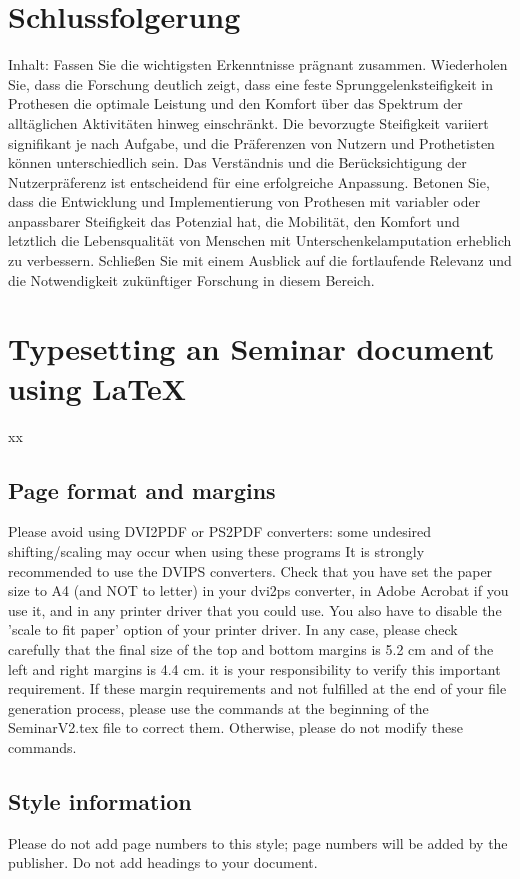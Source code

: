 \documentclass{SeminarV2}
\begin{document}
\section{Schlussfolgerung}
Inhalt: Fassen Sie die wichtigsten Erkenntnisse prägnant zusammen. Wiederholen Sie, dass die Forschung deutlich zeigt, dass eine feste Sprunggelenksteifigkeit in Prothesen die optimale Leistung und den Komfort über das Spektrum der alltäglichen Aktivitäten hinweg einschränkt. Die bevorzugte Steifigkeit variiert signifikant je nach Aufgabe, und die Präferenzen von Nutzern und Prothetisten können unterschiedlich sein. Das Verständnis und die Berücksichtigung der Nutzerpräferenz ist entscheidend für eine erfolgreiche Anpassung. Betonen Sie, dass die Entwicklung und Implementierung von Prothesen mit variabler oder anpassbarer Steifigkeit das Potenzial hat, die Mobilität, den Komfort und letztlich die Lebensqualität von Menschen mit Unterschenkelamputation erheblich zu verbessern. Schließen Sie mit einem Ausblick auf die fortlaufende Relevanz und die Notwendigkeit zukünftiger Forschung in diesem Bereich.

\section{Typesetting an Seminar document using \LaTeX}

xx

\subsection{Page format and margins}
Please avoid using DVI2PDF or PS2PDF converters: some undesired
shifting/scaling may occur when using these programs
It is strongly recommended to use the DVIPS converters. 
%
Check that you have set the paper size to A4 (and NOT to letter) in your
dvi2ps converter, in Adobe Acrobat if you use it, and in any printer driver
that you could use.  You also have to disable the 'scale to fit paper' option
of your printer driver.
%
In any case, please check carefully that the final size of the top and
bottom margins is 5.2 cm and of the left and right margins is 4.4 cm.
it is your responsibility to verify this important requirement.  If these margin requirements and not fulfilled at the end of your file generation process, please use the commands at the beginning of the SeminarV2.tex file to correct them.  Otherwise, please do not modify these commands.

\subsection{Style information}
Please do not add page numbers to this style; page numbers will be added by the publisher. Do not add headings to your document.
\end{document}
